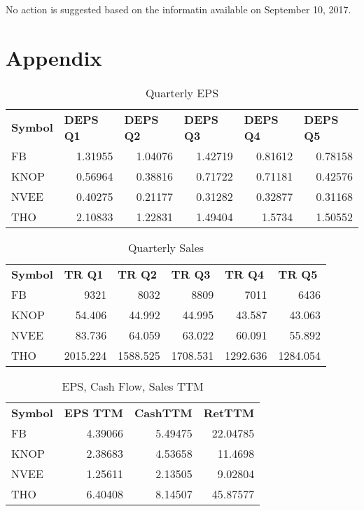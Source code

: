 \documentclass{article}
\begin{document}
No action is suggested based on the informatin available on September 10, 2017.

\section{Appendix}
\begin{table}[htbp]
  \caption{Quarterly EPS}
    \begin{tabular}{lrrrrr}
    \textbf{Symbol} & \multicolumn{1}{l}{\textbf{DEPS Q1}} & \multicolumn{1}{l}{\textbf{DEPS Q2}} & \multicolumn{1}{l}{\textbf{DEPS Q3}} & \multicolumn{1}{l}{\textbf{DEPS Q4}} & \multicolumn{1}{l}{\textbf{DEPS Q5}} \\
    FB    & 1.31955 & 1.04076 & 1.42719 & 0.81612 & 0.78158 \\
    KNOP  & 0.56964 & 0.38816 & 0.71722 & 0.71181 & 0.42576 \\
    NVEE  & 0.40275 & 0.21177 & 0.31282 & 0.32877 & 0.31168 \\
    THO   & 2.10833 & 1.22831 & 1.49404 & 1.5734 & 1.50552 \\
    \end{tabular}%
  \label{tab:addlabel}%
\end{table}%

\begin{table}[htbp]
  \caption{Quarterly Sales}
    \begin{tabular}{lrrrrr}
    \textbf{Symbol} & \multicolumn{1}{l}{\textbf{TR Q1}} & \multicolumn{1}{l}{\textbf{TR Q2}} & \multicolumn{1}{l}{\textbf{TR Q3}} & \multicolumn{1}{l}{\textbf{TR Q4}} & \multicolumn{1}{l}{\textbf{TR Q5}} \\
    FB    & 9321  & 8032  & 8809  & 7011  & 6436 \\
    KNOP  & 54.406 & 44.992 & 44.995 & 43.587 & 43.063 \\
    NVEE  & 83.736 & 64.059 & 63.022 & 60.091 & 55.892 \\
    THO   & 2015.224 & 1588.525 & 1708.531 & 1292.636 & 1284.054 \\
    \end{tabular}%
  \label{tab:addlabel}%
\end{table}%

\begin{table}[htbp]
  \caption{EPS, Cash Flow, Sales TTM}
    \begin{tabular}{lrrr}
    \textbf{Symbol} & \multicolumn{1}{l}{\textbf{EPS TTM}} & \multicolumn{1}{l}{\textbf{CashTTM}} & \multicolumn{1}{l}{\textbf{RetTTM}} \\
    FB    & 4.39066 & 5.49475 & 22.04785 \\
    KNOP  & 2.38683 & 4.53658 & 11.4698 \\
    NVEE  & 1.25611 & 2.13505 & 9.02804 \\
    THO   & 6.40408 & 8.14507 & 45.87577 \\
    \end{tabular}%
  \label{tab:addlabel}%
\end{table}%
\end{document}

